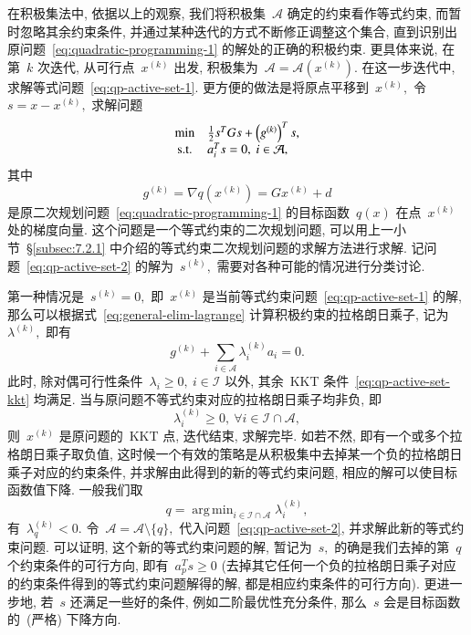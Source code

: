 \documentclass{SBCbookchapter}
\DeclareMathOperator*{\argmin}{arg\,min}
\numberwithin{equation}{section}
\begin{document}
在积极集法中, 依据以上的观察, 我们将积极集~$\mathcal{A}$ 确定的约束看作等式约束, 而暂时忽略其余约束条件, 并通过某种迭代的方式不断修正调整这个集合, 直到识别出原问题~\eqref{eq:quadratic-programming-1} 的解处的正确的积极约束. 更具体来说, 在第~$k$ 次迭代, 从可行点~${x}^{(k)}$ 出发,
积极集为~$\mathcal{A} = \mathcal{A}({x}^{(k)}).$ 在这一步迭代中,
求解等式问题~\eqref{eq:qp-active-set-1}. 更方便的做法是将原点平移到~${x}^{(k)},$ 令~${s} = {x} - {x}^{(k)},$ 求解问题
\begin{equation}
\label{eq:qp-active-set-2}
\begin{array}{cl}
\min & \frac{1}{2} {s}^T G {s} + \left( {g}^{(k)} \right)^T {s}, \\
{\rm s.t.} & {a}_i^T {s} = 0, ~ i \in \mathcal{A},
\end{array}
\end{equation}
其中
\begin{equation*}
{g}^{(k)} = \nabla q({x}^{(k)}) = G {x}^{(k)} + {d}
\end{equation*}
是原二次规划问题~\eqref{eq:quadratic-programming-1} 的目标函数~$q({x})$ 在点~${x}^{(k)}$ 处的梯度向量.  这个问题是一个等式约束的二次规划问题, 可以用上一小节~\S\ref{subsec:7.2.1} 中介绍的等式约束二次规划问题的求解方法进行求解. 记问题~\eqref{eq:qp-active-set-2} 的解为~${s}^{(k)},$ 需要对各种可能的情况进行分类讨论.

第一种情况是~${s}^{(k)} = {0},$ 即~${x}^{(k)}$ 是当前等式约束问题~\eqref{eq:qp-active-set-1} 的解, 那么可以根据式~\eqref{eq:general-elim-lagrange} 计算积极约束的拉格朗日乘子, 记为~${\lambda}^{(k)},$  即有
\begin{equation}
\label{eq:qp-active-set-lambda}
{g}^{(k)} + \sum\limits_{i \in \mathcal{A}} \lambda_i^{(k)} a_i = 0.
\end{equation}
此时, 除对偶可行性条件~$\lambda_i \geqslant 0, ~ i \in \mathcal{I}$ 以外, 其余~KKT
条件~\eqref{eq:qp-active-set-kkt} 均满足. 当与原问题不等式约束对应的拉格朗日乘子均非负, 即
\begin{equation*}
\lambda_i^{(k)} \geqslant 0, ~ \forall i \in \mathcal{I} \cap \mathcal{A},
\end{equation*}
则~$x^{(k)}$ 是原问题的~KKT 点, 迭代结束, 求解完毕. 如若不然, 即有一个或多个拉格朗日乘子取负值,
这时候一个有效的策略是从积极集中去掉某一个负的拉格朗日乘子对应的约束条件, 并求解由此得到的新的等式约束问题, 相应的解可以使目标函数值下降. 一般我们取
\begin{equation}
\label{eq:qp-active-set-inactive-index}
q = \argmin_{i \in \mathcal{I} \cap \mathcal{A}} \lambda_i^{(k)},
\end{equation}
有~$\lambda_q^{(k)} < 0.$ 令~$\mathcal{A} = \mathcal{A} \setminus \{ q \},$
代入问题~\eqref{eq:qp-active-set-2}, 并求解此新的等式约束问题. 可以证明, 这个新的等式约束问题的解,
暂记为~$s,$ 的确是我们去掉的第~$q$ 个约束条件的可行方向, 即有~$a_p^T s \geqslant 0$ (去掉其它任何一个负的拉格朗日乘子对应的约束条件得到的等式约束问题解得的解, 都是相应约束条件的可行方向). 更进一步地, 若~$s$ 还满足一些好的条件, 例如二阶最优性充分条件, 那么~$s$ 会是目标函数的~(严格) 下降方向.
\end{document}
